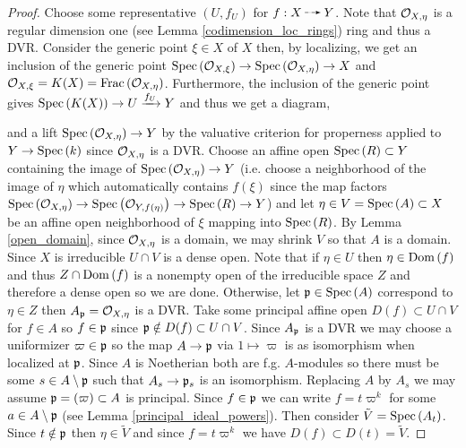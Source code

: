 \documentclass[12pt]{article}
\begin{document}
\begin{proof}
Choose some representative $(U, f_U)$ for $f : X \rat Y$. Note that $\mathcal{O}_{X, \eta}$ is a regular dimension one (see Lemma \ref{codimension_loc_rings}) ring and thus a DVR. Consider the generic point $\xi \in X$ of $X$ then, by localizing, we get an inclusion of the generic point $\mathrm{Spec}\left( \mathcal{O}_{X, \xi} \right) \to \mathrm{Spec}\left( \mathcal{O}_{X, \eta} \right) \to X$ and $\mathcal{O}_{X, \xi} = K(X) = \mathrm{Frac}\left(\mathcal{O}_{X, \eta}\right)$. Furthermore, the inclusion of the generic point gives $\mathrm{Spec}\left( K(X) \right) \to U \xrightarrow{f_U} Y$ and thus we get a diagram,
\begin{center}
\end{center}
and a lift $\mathrm{Spec}\left( \mathcal{O}_{X, \eta} \right) \to Y$ by the valuative criterion for properness applied to $Y \to \mathrm{Spec}\left( k \right)$ since $\mathcal{O}_{X, \eta}$ is a DVR. Choose an affine open $\mathrm{Spec}\left( R \right) \subset Y$ containing the image of $\mathrm{Spec}\left( \mathcal{O}_{X, \eta} \right) \to Y$ (i.e. choose a neighborhood of the image of $\eta$ which automatically contains $f(\xi)$ since the map factors $\mathrm{Spec}\left( \mathcal{O}_{X, \eta} \right) \to \mathrm{Spec}\left( \mathcal{O}_{Y, f(\eta)} \right) \to \mathrm{Spec}\left( R \right) \to Y$) and let $\eta \in V = \mathrm{Spec}\left( A \right) \subset X$ be an affine open neighborhood of $\xi$ mapping into $\mathrm{Spec}\left( R \right)$. By Lemma \ref{open_domain}, since $\mathcal{O}_{X, \eta}$ is a domain, we may shrink $V$ so that $A$ is a domain. Since $X$ is irreducible $U \cap V$ is a dense open. Note that if $\eta \in U$ then $\eta \in \mathrm{Dom}\left(f \right)$ and thus $Z \cap \mathrm{Dom}\left(f \right)$ is a nonempty open of the irreducible space $Z$ and therefore a dense open so we are done. Otherwise, let $\mathfrak{p} \in \mathrm{Spec}\left( A \right)$ correspond to $\eta \in Z$ then $A_{\mathfrak{p}} = \mathcal{O}_{X, \eta}$ is a  DVR. Take some principal affine open $D(f) \subset U \cap V$ for $f \in A$ so $f \in \mathfrak{p}$ since $\mathfrak{p} \notin D(f) \subset U \cap V$. Since $A_{\mathfrak{p}}$ is a DVR we may choose a uniformizer $\varpi \in \mathfrak{p}$ so the map $A \to \mathfrak{p}$ via $1 \mapsto \varpi$ is as isomorphism when localized at $\mathfrak{p}$. Since $A$ is Noetherian both are f.g. $A$-modules so there must be some $s \in A \setminus \mathfrak{p}$ such that $A_s \to \mathfrak{p}_s$ is an isomorphism. Replacing $A$ by $A_s$ we may assume $\mathfrak{p} = (\varpi) \subset A$ is principal. Since $f \in \mathfrak{p}$ we can write $f = t \varpi^k$ for some $a \in A \setminus \mathfrak{p}$ (see Lemma \ref{principal_ideal_powers}). Then consider $\tilde{V} = \mathrm{Spec}\left( A_t \right)$. Since $t \notin \mathfrak{p}$ then $\eta \in \tilde{V}$ and since $f = t \varpi^k$ we have $D(f) \subset D(t) = \tilde{V}$.

\end{proof}
\end{document}
